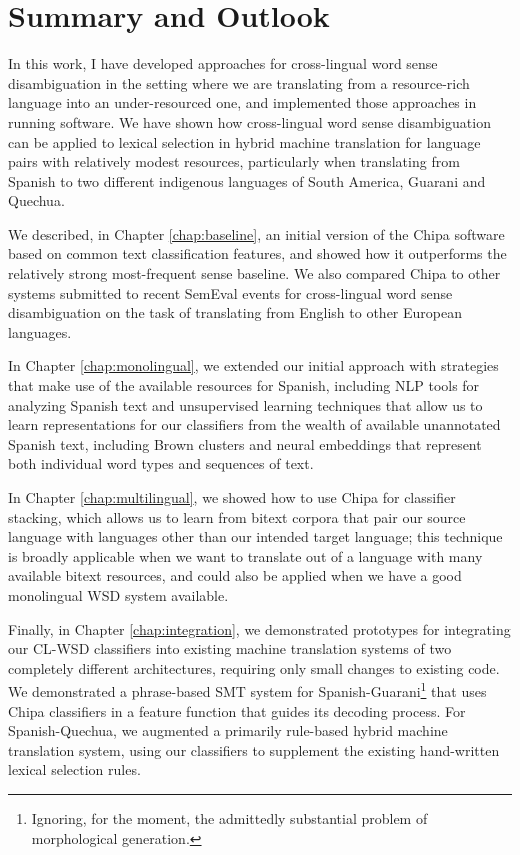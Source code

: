 \chapter{Summary and Outlook}
\label{chap:conclusions}

In this work, I have developed approaches for cross-lingual word sense
disambiguation in the setting where we are translating from a resource-rich
language into an under-resourced one, and implemented those approaches in
running software.
We have shown how cross-lingual word sense disambiguation can be applied to
lexical selection in hybrid machine translation for language pairs with
relatively modest resources, particularly when translating from Spanish to two
different indigenous languages of South America, Guarani and Quechua.

We described, in Chapter \ref{chap:baseline}, an initial version of the Chipa
software based on common text classification features, and showed how it
outperforms the relatively strong most-frequent sense baseline. We also
compared Chipa to other systems submitted to recent SemEval events for
cross-lingual word sense disambiguation on the task of translating from English
to other European languages.

In Chapter \ref{chap:monolingual}, we extended our initial approach with
strategies that make use of the available resources for Spanish, including NLP
tools for analyzing Spanish text and unsupervised learning techniques that
allow us to learn representations for our classifiers from the wealth of
available unannotated Spanish text, including Brown clusters and neural
embeddings that represent both individual word types and sequences of text.

In Chapter \ref{chap:multilingual}, we showed how to use Chipa for classifier
stacking, which allows us to learn from bitext corpora that pair our source
language with languages other than our intended target language; this technique
is broadly applicable when we want to translate out of a language with many
available bitext resources, and could also be applied when we have a good
monolingual WSD system available.

Finally, in Chapter \ref{chap:integration}, we demonstrated prototypes for
integrating our CL-WSD classifiers into existing machine translation systems of
two completely different architectures, requiring only small changes to
existing code.  We demonstrated a phrase-based SMT system for
Spanish-Guarani\footnote{Ignoring, for the moment, the admittedly substantial
problem of morphological generation.} that uses Chipa classifiers in a feature
function that guides its decoding process. For Spanish-Quechua, we augmented a
primarily rule-based hybrid machine translation system, using our classifiers
to supplement the existing hand-written lexical selection rules.

